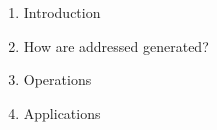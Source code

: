 \begin{enumerate}
  
  \item Introduction
    
    
  \item How are addressed generated?
    

\newpage
  \item Operations
    
    
  \item Applications
    

\end{enumerate}

